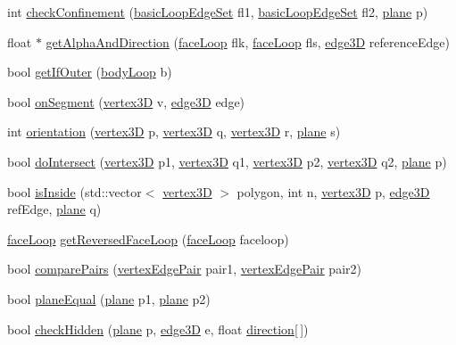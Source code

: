 \begin{DoxyCompactItemize}
\item 
int \mbox{\hyperlink{namespacegeneral_methods_a2bb810600ec90ec064ea8496ee0ab862}{check\+Confinement}} (\mbox{\hyperlink{classbasic_loop_edge_set}{basic\+Loop\+Edge\+Set}} fl1, \mbox{\hyperlink{classbasic_loop_edge_set}{basic\+Loop\+Edge\+Set}} fl2, \mbox{\hyperlink{structplane}{plane}} p)
\item 
float $\ast$ \mbox{\hyperlink{namespacegeneral_methods_a0bd9c59442b6f9c7fd3ae00832ee30df}{get\+Alpha\+And\+Direction}} (\mbox{\hyperlink{classface_loop}{face\+Loop}} flk, \mbox{\hyperlink{classface_loop}{face\+Loop}} fls, \mbox{\hyperlink{structedge3_d}{edge3D}} reference\+Edge)
\item 
bool \mbox{\hyperlink{namespacegeneral_methods_a4ebb8d563530558e025b62c647045efe}{get\+If\+Outer}} (\mbox{\hyperlink{classbody_loop}{body\+Loop}} b)
\item 
bool \mbox{\hyperlink{namespacegeneral_methods_a557bf2257d6658862b42124035aa9588}{on\+Segment}} (\mbox{\hyperlink{structvertex3_d}{vertex3D}} v, \mbox{\hyperlink{structedge3_d}{edge3D}} edge)
\item 
int \mbox{\hyperlink{namespacegeneral_methods_a7bfbfb2a02328d76e70f66fedd57c4ef}{orientation}} (\mbox{\hyperlink{structvertex3_d}{vertex3D}} p, \mbox{\hyperlink{structvertex3_d}{vertex3D}} q, \mbox{\hyperlink{structvertex3_d}{vertex3D}} r, \mbox{\hyperlink{structplane}{plane}} s)
\item 
bool \mbox{\hyperlink{namespacegeneral_methods_a56efd049c58aae30a7b0caf39beab615}{do\+Intersect}} (\mbox{\hyperlink{structvertex3_d}{vertex3D}} p1, \mbox{\hyperlink{structvertex3_d}{vertex3D}} q1, \mbox{\hyperlink{structvertex3_d}{vertex3D}} p2, \mbox{\hyperlink{structvertex3_d}{vertex3D}} q2, \mbox{\hyperlink{structplane}{plane}} p)
\item 
bool \mbox{\hyperlink{namespacegeneral_methods_a27b7ed292415027c495942147e8856b7}{is\+Inside}} (std\+::vector$<$ \mbox{\hyperlink{structvertex3_d}{vertex3D}} $>$ polygon, int n, \mbox{\hyperlink{structvertex3_d}{vertex3D}} p, \mbox{\hyperlink{structedge3_d}{edge3D}} ref\+Edge, \mbox{\hyperlink{structplane}{plane}} q)
\item 
\mbox{\hyperlink{classface_loop}{face\+Loop}} \mbox{\hyperlink{namespacegeneral_methods_afe4087e253b318326a0a1578d34b42ca}{get\+Reversed\+Face\+Loop}} (\mbox{\hyperlink{classface_loop}{face\+Loop}} faceloop)
\item 
bool \mbox{\hyperlink{namespacegeneral_methods_afc8f20af710f8dc24af591015acc1403}{compare\+Pairs}} (\mbox{\hyperlink{structvertex_edge_pair}{vertex\+Edge\+Pair}} pair1, \mbox{\hyperlink{structvertex_edge_pair}{vertex\+Edge\+Pair}} pair2)
\item 
bool \mbox{\hyperlink{namespacegeneral_methods_a3c49599a5ba8f2c41f2ef542bde19765}{plane\+Equal}} (\mbox{\hyperlink{structplane}{plane}} p1, \mbox{\hyperlink{structplane}{plane}} p2)
\item 
bool \mbox{\hyperlink{namespacegeneral_methods_ab4e1b4b0a8b5b7697adddbb27950e639}{check\+Hidden}} (\mbox{\hyperlink{structplane}{plane}} p, \mbox{\hyperlink{structedge3_d}{edge3D}} e, float \mbox{\hyperlink{structdirection}{direction}}\mbox{[}$\,$\mbox{]})
\end{DoxyCompactItemize}


